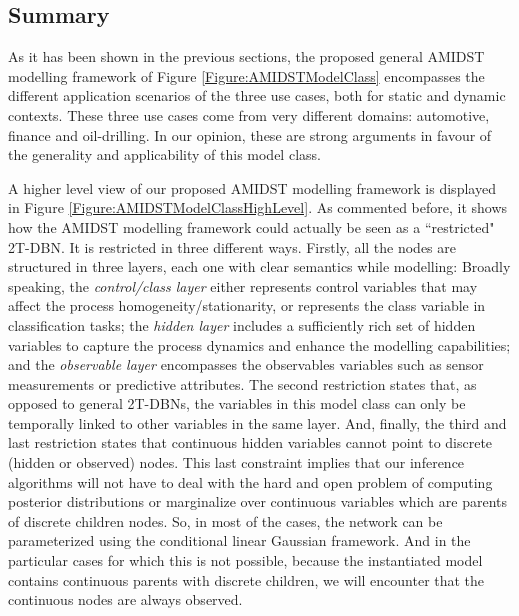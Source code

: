 \subsection{Summary}\label{summaryAMIDSTModels}

As it has been shown in the previous sections, the proposed general AMIDST modelling framework of Figure \ref{Figure:AMIDSTModelClass} encompasses the different application scenarios of the three use cases, both for static and dynamic contexts. These three use cases come from very different domains: automotive, finance and oil-drilling. In our opinion, these are strong arguments in favour of the generality and applicability of this model class. 

A higher level view of our proposed AMIDST modelling framework is displayed in Figure \ref{Figure:AMIDSTModelClassHighLevel}. As commented before, it shows how the AMIDST modelling framework could actually be seen as a ``restricted" 2T-DBN. It is restricted in three different ways. Firstly, all the nodes are structured in three layers, each one with clear semantics while modelling: Broadly speaking, the \textit{control/class layer} either represents control variables that may affect the process homogeneity/stationarity, or represents the class variable in classification tasks; the \textit{hidden layer} includes a sufficiently rich set of hidden variables to capture the process dynamics and enhance the modelling capabilities; and the \textit{observable layer} encompasses the observables variables such as sensor measurements or predictive attributes. The second restriction states that, as opposed to general 2T-DBNs, the variables in this model class can only be temporally linked to other variables in the same layer. And, finally, the third and last restriction  states that continuous hidden variables cannot point to discrete (hidden or observed) nodes. This last constraint implies that our inference algorithms will not have to deal with the hard and open problem of computing posterior distributions or marginalize over continuous variables which are parents of discrete children nodes. So, in most of the cases, the network can be parameterized using the conditional linear Gaussian framework. And in the particular cases for which this is not possible, because the instantiated model contains continuous parents with discrete children, we will encounter that the continuous nodes are always observed. 


